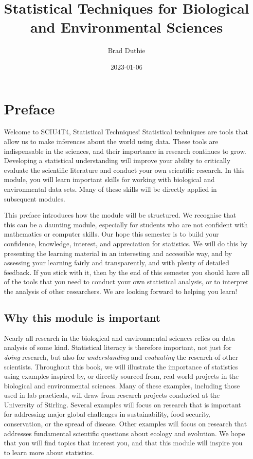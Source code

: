 \documentclass[
]{scrbook}
\title{Statistical Techniques for Biological and Environmental Sciences}
\author{Brad Duthie}
\date{2023-01-06}
\begin{document}
\maketitle

{
\hypersetup{linkcolor=}
\setcounter{tocdepth}{1}
\tableofcontents
}
\hypertarget{preface}{%
\chapter*{Preface}\label{preface}}

Welcome to SCIU4T4, Statistical Techniques!
Statistical techniques are tools that allow us to make inferences about the world using data.
These tools are indispensable in the sciences, and their importance in research continues to grow.
Developing a statistical understanding will improve your ability to critically evaluate the scientific literature and conduct your own scientific research.
In this module, you will learn important skills for working with biological and environmental data sets.
Many of these skills will be directly applied in subsequent modules.

This preface introduces how the module will be structured.
We recognise that this can be a daunting module, especially for students who are not confident with mathematics or computer skills.
Our hope this semester is to build your confidence, knowledge, interest, and appreciation for statistics.
We will do this by presenting the learning material in an interesting and accessible way, and by assessing your learning fairly and transparently, and with plenty of detailed feedback.
If you stick with it, then by the end of this semester you should have all of the tools that you need to conduct your own statistical analysis, or to interpret the analysis of other researchers.
We are looking forward to helping you learn!

\hypertarget{why-this-module-is-important}{%
\section*{Why this module is important}\label{why-this-module-is-important}}

Nearly all research in the biological and environmental sciences relies on data analysis of some kind.
Statistical literacy is therefore important, not just for \emph{doing} research, but also for \emph{understanding} and \emph{evaluating} the research of other scientists.
Throughout this book, we will illustrate the importance of statistics using examples inspired by, or directly sourced from, real-world projects in the biological and environmental sciences.
Many of these examples, including those used in lab practicals, will draw from research projects conducted at the University of Stirling.
Several examples will focus on research that is important for addressing major global challenges in sustainability, food security, conservation, or the spread of disease.
Other examples will focus on research that addresses fundamental scientific questions about ecology and evolution.
We hope that you will find topics that interest you, and that this module will inspire you to learn more about statistics.
\end{document}
